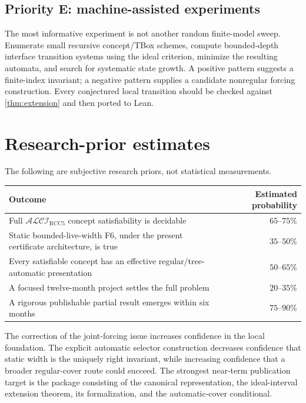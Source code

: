 \documentclass[11pt]{article}
\theoremstyle{definition}
\theoremstyle{remark}
\newcommand{\ALCIRCC}{\mathcal{ALCI}_{\mathrm{RCC5}}}
\begin{document}
\subsection{Priority E: machine-assisted experiments}

The most informative experiment is not another random finite-model sweep.  Enumerate small recursive concept/TBox schemes, compute bounded-depth interface transition systems using the ideal criterion, minimize the resulting automata, and search for systematic state growth.  A positive pattern suggests a finite-index invariant; a negative pattern supplies a candidate nonregular forcing construction.  Every conjectured local transition should be checked against \cref{thm:extension} and then ported to Lean.

\section{Research-prior estimates}

The following are subjective research priors, not statistical measurements.

\begin{center}
\begin{tabularx}{0.94\textwidth}{Xr}
\toprule
Outcome & Estimated probability\\
\midrule
Full $\ALCIRCC$ concept satisfiability is decidable & $65$--$75\%$\\
Static bounded-live-width F6, under the present certificate architecture, is true & $35$--$50\%$\\
Every satisfiable concept has an effective regular/tree-automatic presentation & $50$--$65\%$\\
A focused twelve-month project settles the full problem & $20$--$35\%$\\
A rigorous publishable partial result emerges within six months & $75$--$90\%$\\
\bottomrule
\end{tabularx}
\end{center}

The correction of the joint-forcing issue increases confidence in the local foundation.  The explicit automatic selector construction decreases confidence that static width is the uniquely right invariant, while increasing confidence that a broader regular-cover route could succeed.  The strongest near-term publication target is the package consisting of the canonical representation, the ideal-interval extension theorem, its formalization, and the automatic-cover conditional.
\end{document}
